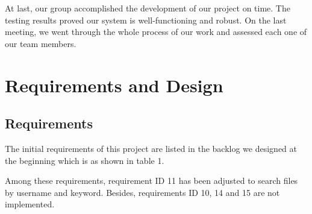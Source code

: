 \documentclass[a4paper,11pt]{article}
\begin{document}
\par At last, our group accomplished the development of our project on time. The testing results proved our system is well-functioning and robust. On the last meeting, we went through the whole process of our work and assessed each one of our team members.

\section{Requirements and Design}
\subsection{Requirements}
\par The initial requirements of this project are listed in the backlog we designed at the beginning which is as shown in table 1.
\par Among these requirements, requirement ID 11 has been adjusted to search files by username and keyword. Besides, requirements ID 10, 14 and 15 are not implemented.
\end{document}

